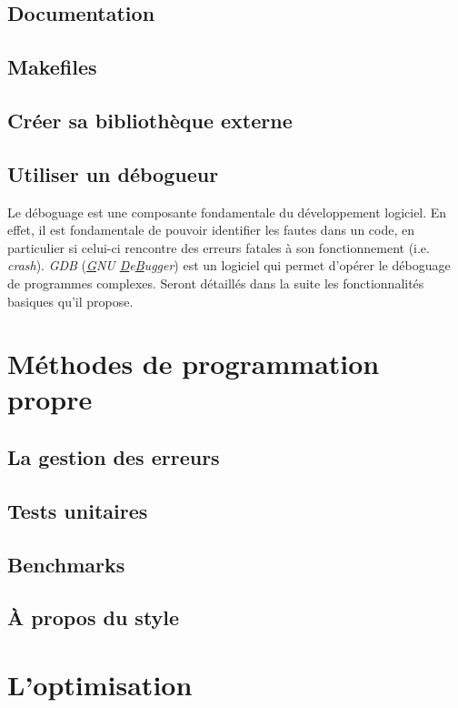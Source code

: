 \documentclass{minitelreport}
\begin{document}
\begin{refsection}
		\section{Documentation}
		
		\section{Makefiles}
		
		\section{Créer sa bibliothèque externe}
		\section{Utiliser un débogueur}
		Le déboguage est une composante fondamentale du développement logiciel. En effet, il est fondamentale de pouvoir identifier les fautes dans un code, en particulier si celui-ci rencontre des erreurs fatales à son fonctionnement (i.e. \textit{crash}). \textit{GDB} (\textit{\underline{G}NU \underline{D}e\underline{B}ugger}) est un logiciel qui permet d'opérer le déboguage de programmes complexes. Seront détaillés dans la suite les fonctionnalités basiques qu'il propose.
	\chapter{Méthodes de programmation propre}
		\section{La gestion des erreurs}
		
		\section{Tests unitaires}
		
		\section{Benchmarks}
		
		\section{À propos du style}
		
	\chapter{L'optimisation}

\end{refsection}
\end{document}
